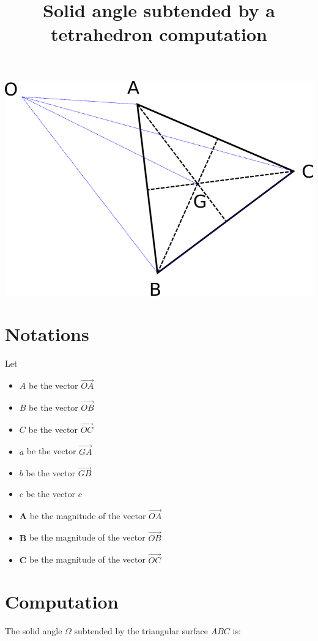 \documentclass[10pt,a4paper]{article}
\title{Solid angle subtended by a tetrahedron computation}
\begin{document}
\maketitle


\includegraphics[scale=0.4]{tetra.png} 


\section{Notations}

Let

\begin{itemize}
	\item $A$ be the vector $\vec{OA}$
	\item $B$ be the vector $\vec{OB}$
	\item $C$ be the vector $\vec{OC}$
	\item $a$ be the vector $\vec{GA}$
	\item $b$ be the vector $\vec{GB}$
	\item $c$ be the vector $c$
	\item $\mathbf{A}$ be the magnitude of the vector $\vec{OA}$
	\item $\mathbf{B}$ be the magnitude of the vector $\vec{OB}$
	\item $\mathbf{C}$ be the magnitude of the vector $\vec{OC}$
\end{itemize}

\section{Computation}

The solid angle $\Omega$ subtended by the triangular surface $ABC$ is:
\end{document}
